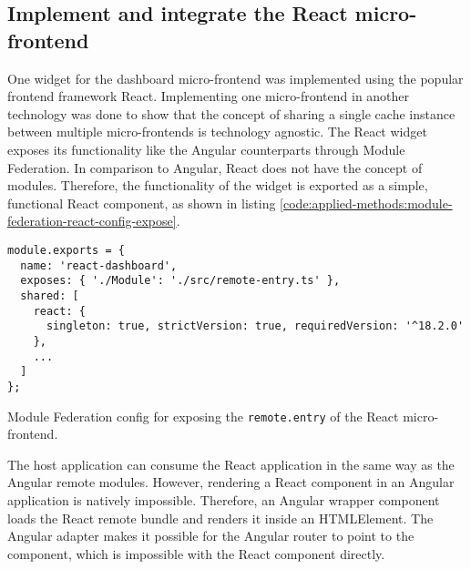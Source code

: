 \subsection{Implement and integrate the React micro-frontend}\label{subsection:applied-methods:prototypical-implementation:react-micro-frontend}

One widget for the dashboard micro-frontend was implemented using the popular frontend framework React. Implementing one micro-frontend in another technology was done to show that the concept of sharing a single cache instance between multiple micro-frontends is technology agnostic. The React widget exposes its functionality like the Angular counterparts through Module Federation. In comparison to Angular, React does not have the concept of modules. Therefore, the functionality of the widget is exported as a simple, functional React component, as shown in listing  \ref{code:applied-methods:module-federation-react-config-expose}.

\ifshowListings
\begin{listing}[H]
    \begin{verbatim}
module.exports = {
  name: 'react-dashboard',
  exposes: { './Module': './src/remote-entry.ts' },
  shared: [
    react: {
      singleton: true, strictVersion: true, requiredVersion: '^18.2.0' 
    },
    ...
  ]
};
    \end{verbatim}
    \caption{Module Federation config for exposing the \texttt{remote.entry} of the React micro-frontend.}\label{code:applied-methods:module-federation-react-config-expose}
\end{listing}
\fi

\noindent The host application can consume the React application in the same way as the Angular remote modules. However, rendering a React component in an Angular application is natively impossible. Therefore, an Angular wrapper component loads the React remote bundle and renders it inside an HTMLElement. The Angular adapter makes it possible for the Angular router to point to the component, which is impossible with the React component directly.

\bigskip


